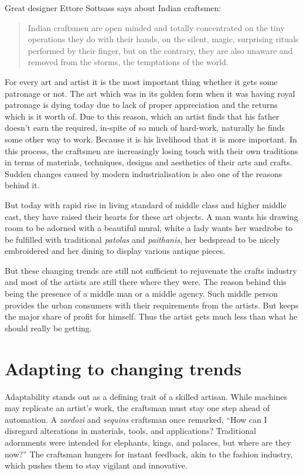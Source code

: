 Great designer Ettore Sottsass says about Indian craftsmen:

\begin{quote}
  Indian craftsmen are open minded and totally concentrated on the tiny operations they do with their hands, on the silent, magic, surprising rituals performed by their finger, but on the contrary, they are also unaware and removed from the storms, the temptations of the world.
\end{quote}

For every art and artist it is the most important thing whether it gets some patronage or not. The art which was in its golden form when it was having royal patronage is dying today due to lack of proper appreciation and the returns which is it worth of. Due to this reason, which an artist finds that his father doesn't earn the required, in-spite of so much of hard-work, naturally he finds some other way to work. Because it is his livelihood that it is more important. In this process, the craftsmen are increasingly losing touch with their own traditions in terms of materials, techniques, designs and aesthetics of their arts and crafts. Sudden changes caused by modern industrialisation is also one of the reasons behind it.

But today with rapid rise in living standard of middle class and higher middle cast, they have raised their hearts for these art objects. A man wants his drawing room to be adorned with a beautiful mural, white a lady wants her wardrobe to be fulfilled with traditional \emph{patolas} and \emph{paithanis}, her bedspread to be nicely embroidered and her dining to display various antique pieces.

But these changing trends are still not sufficient to rejuvenate the crafts industry and most of the artists are still there where they were. The reason behind this being the presence of a middle man or a middle agency. Such middle person provides the urban consumers with their requirements from the artists. But keeps the major share of profit for himself. Thus the artist gets much less than what he should really be getting.


\section{Adapting to changing trends} %
\label{sec:act}

Adaptability stands out as a defining trait of a skilled artisan. While machines may replicate an artist's work, the craftsman must stay one step ahead of automation. A \emph{zardozi} and \emph{sequins} craftsman once remarked, ``How can I disregard alterations in materials, tools, and applications? Traditional adornments were intended for elephants, kings, and palaces, but where are they now?'' The craftsman hungers for instant feedback, akin to the fashion industry, which pushes them to stay vigilant and innovative.

